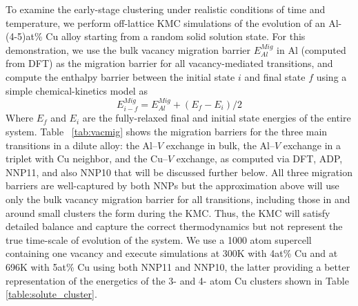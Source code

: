 \documentclass{article}
\begin{document}
To examine the early-stage clustering under realistic conditions of time and temperature, we perform off-lattice KMC simulations of the evolution of an Al-(4-5)at\% Cu alloy starting from a random solid solution state.  For this demonstration, we use the bulk vacancy migration barrier $E^{Mig}_{Al}$ in Al (computed from DFT) as the migration barrier for all vacancy-mediated transitions, and compute the enthalpy barrier between the initial state $i$ and final state $f$ using a simple chemical-kinetics model as
\begin{equation}
E^{Mig}_{i-f}= E^{Mig}_{Al} + (E_{f} - E_{i})/2
\end{equation}
Where $E_{f}$ and $E_{i}$ are the fully-relaxed final and initial state energies of the entire system.  Table ~\ref{tab:vacmig} shows the migration barriers for the three main transitions in a dilute alloy: the Al--$\textit{V}$ exchange in bulk, the Al--$\textit{V}$ exchange in a triplet with Cu neighbor, and the Cu--$\textit{V}$ exchange, as computed via DFT\cite{Mantina2009FirstCoefficients}, ADP, NNP11, and also NNP10 that will be discussed further below.  All three migration barriers are well-captured by both NNPs but the approximation above will use only the bulk vacancy migration barrier for all transitions, including those in and around small clusters the form during the KMC.  Thus, the KMC will satisfy detailed balance and capture the correct thermodynamics but not represent the true time-scale of evolution\cite{Mantina2009FirstCoefficients} of the system. We use a 1000 atom supercell containing one vacancy and execute simulations at 300K with 4at\% Cu and at 696K with 5at\% Cu using both NNP11 and NNP10, the latter providing a better representation of the energetics of the 3- and 4- atom Cu clusters shown in Table \ref{table:solute_cluster}.
\end{document}
